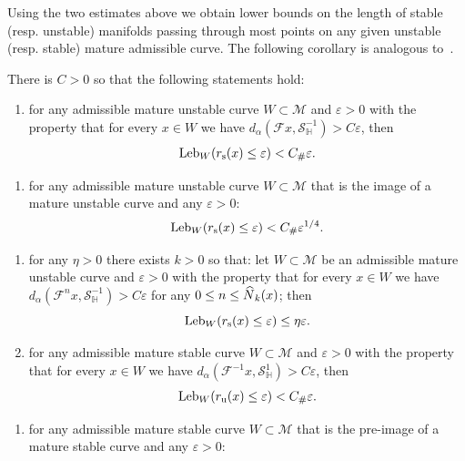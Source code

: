 \documentclass[AHL, Unicode, longabstracts,published]{cedram}
\newcommand{\eps}{\varepsilon}
\newcommand{\inv}{^{-1}}
\newcommand{\unstable}{\text{u}}
\newcommand{\stable}{\text{s}}
\newcommand{\homo}{\mathbb{H}}
\newcommand{\cm}{\mathcal{F}}
\newcommand{\csp}{\mathcal{M}}
\newcommand{\rs}{r_{\stable}}
\newcommand{\ru}{r_{\unstable}}
\newcommand{\singPrivate}{\mathcal{S}}
\newcommand{\hsing}[1]{{\singPrivate}_\homo^{#1}}
\newcommand{\admiss}{admissible}
\newcommand{\adm}{_{\alpha^{+}}}
\newcommand{\Np}{\hat N}
\newcommand{\Leb}{\textup{Leb}}
\newcommand{\Const}{C_\#}
\renewcommand{\adm}{_{\alpha}}
\newcommand*{\relabel}{\renewcommand{\labelenumi}{(\theenumi)}}
\newcommand*{\alphenumi}{\renewcommand*{\theenumi}{\alph{enumi}}\relabel}
\newcommand*{\alphenumipr}{\renewcommand*{\theenumi}{\alph{enumi}'}\relabel}
\let\oldhat\hat
\renewcommand*{\hat}[1]{\mathchoice{\widehat{#1}}{\widehat{#1}}{\oldhat{#1}}{\oldhat{#1}}}
\begin{document}
Using the two estimates above we obtain lower bounds on the length of stable (resp. unstable) manifolds passing through most points on any given unstable (resp. stable) mature admissible curve. The following corollary is analogous to~\cite[Theorems~5.66--5.67, \S5.12]{ChM}.


\begin{coro}\label{CorSize}
There is $C > 0$ so that the following
statements hold:
\begin{enumerate}\alphenumi
\item \label{coro7.10.a} for any \admiss{} mature unstable curve $W\subset\csp$ and $\eps > 0$ with the property that for every $x\in W$ we have $d\adm(\cm x,\hsing{-1}) > C\eps$, then
\begin{align*}
\Leb_{W}(\rs(x)\le\eps) < \Const \eps.
\end{align*}
\end{enumerate}
\begin{enumerate}\alphenumipr
\item \label{coro7.10.a'} for any \admiss{} mature unstable curve $W\subset\csp$ that is the image of a mature unstable curve and any $\eps > 0$:
\begin{align*}
\Leb_{W}(\rs(x)\le\eps) < \Const \eps^{1/4}.
\end{align*}
\end{enumerate}
\begin{enumerate}\alphenumi
\setcounter{enumi}{1}
\item\label{coro7.10.b} for any $\eta > 0$ there exists $k > 0$ so that: let $W\subset\csp$ be an \admiss{} mature unstable curve and $\eps > 0$ with the property that for every $x\in W$ we have $d_{\alpha}(\cm^{n}x,\hsing{-1}) > C \eps$ for any $0\le n \le \Np_{k}(x)$; then
\begin{equation}\label{ShortStable}
\Leb_W(\rs(x)\leq \eps)\leq\eta\eps.
\end{equation}
\item\label{coro7.10.c} for any \admiss{} mature stable curve $W\subset\csp$ and $\eps > 0$ with the property that for every $x\in W$ we have $d\adm(\cm\inv x,\hsing{1}) > C\eps$, then
\begin{align*}
\Leb_{W}(\ru(x)\le\eps) < \Const \eps.
\end{align*}
\end{enumerate}
\begin{enumerate}\alphenumipr
\setcounter{enumi}{2}
\item \label{coro7.10.c'} for any \admiss{} mature stable curve $W\subset\csp$ that is the pre-image of a mature stable curve and any $\eps > 0$:

\end{enumerate}
\end{coro}
\end{document}
